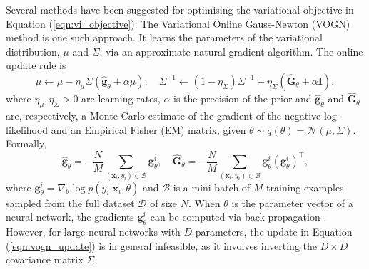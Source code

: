 \documentclass[msc,deptreport.inf]{infthesis} %
\newcommand{\matr}[1]{\mathbf{#1}}
\begin{document}
Several methods have been suggested for optimising the variational objective in Equation (\ref{eqn:vi_objective}). The Variational Online Gauss-Newton (VOGN) method \cite{tangkaratt2018} is one such approach. It learns the parameters of the variational distribution, $\mu$ and $\Sigma$, via an approximate natural gradient algorithm. The online update rule is
\begin{equation}\label{eqn:vogn_update}
	\mu \leftarrow \mu - \eta_\mu \Sigma (\hat{\matr{g}}_\theta + \alpha \mu), \quad 
	\Sigma^{-1} \leftarrow (1 - \eta_\Sigma) \Sigma^{-1} + \eta_\Sigma(\hat{\matr{G}}_\theta + \alpha \matr{I}),
\end{equation}
where $\eta_\mu, \eta_\Sigma > 0$ are learning rates, $\alpha$ is the precision of the prior and $\hat{\matr{g}}_\theta$ and $\hat{\matr{G}}_\theta$ are, respectively, a Monte Carlo estimate of the gradient of the negative log-likelihood and an Empirical Fisher (EM) matrix, given $\theta \sim q(\theta) = \mathcal{N}(\mu, \Sigma)$. Formally, 
\begin{equation}
	\hat{\matr{g}}_\theta = -\frac{N}{M} \sum_{(\matr{x}_i, y_i) \in \mathcal{B}} \matr{g}_\theta^i, \quad
	\hat{\matr{G}}_\theta = -\frac{N}{M} \sum_{(\matr{x}_i, y_i) \in \mathcal{B}} \matr{g}_\theta^i (\matr{g}_\theta^i)^\intercal,
\end{equation}
where $\matr{g}_\theta^i = \nabla_\theta \log p(y_i | \matr{x}_i, \theta)$ and $\mathcal{B}$ is a mini-batch of $M$ training examples sampled from the full dataset $\mathcal{D}$ of size $N$. When $\theta$ is the parameter vector of a neural network, the gradients $\matr{g}_\theta^i$ can be computed via back-propagation \cite{rumelhart1986}. However, for large neural networks with $D$ parameters, the update in Equation (\ref{eqn:vogn_update}) is in general infeasible, as it involves inverting the $D \times D$ covariance matrix $\Sigma$.
\end{document}
